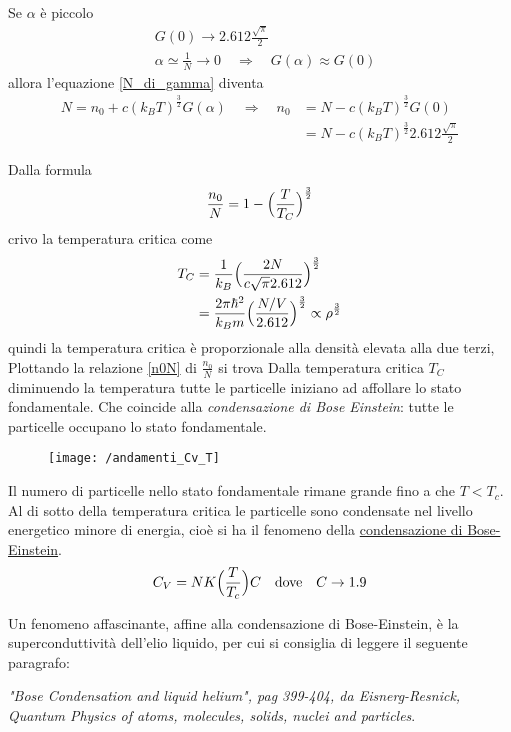 Se $\alpha$ è piccolo
\begin{equation}
\begin{split}
& G(0) \to 2.612 \frac{\sqrt{\pi}}{2} \\
& \alpha \simeq \frac{1}{N} \to 0 \quad\Rightarrow\quad G(\alpha) \approx G(0)
\end{split}
\end{equation}
allora l'equazione \ref{N_di_gamma} diventa
\begin{equation}
\begin{split}
N = n_0 + c (k_B T)^{ \frac{3}{2} } G(\alpha)
\quad\Rightarrow\quad 
n_0 & = N -  c (k_B T)^{ \frac{3}{2} } G(0) \\
& = N -  c (k_B T)^{ \frac{3}{2} } 2.612 \frac{\sqrt{\pi}}{2}
\end{split}
\end{equation}

Dalla formula 
\begin{equation}
\frac{n_0}{N} = 1 - \Bigl(  \frac{T}{T_C}  \Bigr)^{ \frac{3}{2} } 
\label{n0N}
\end{equation}
crivo la temperatura critica come
\begin{equation}
\begin{split}
T_C & = \frac{1}{k_B} \Bigl(  \frac{2N}{c \sqrt{\pi} 2.612}  \Bigr)^{ \frac{3}{2} } \\
&= \frac{2\pi \hbar^2}{k_B m} \Bigl(  \frac{N/V}{2.612}  \Bigr)^{ \frac{3}{2} } \propto \rho^{ \frac{3}{2} }
\end{split}
\end{equation}
quindi la temperatura critica è proporzionale alla densità elevata alla due terzi,
Plottando la relazione \ref{n0N} di $\frac{n_0}{N}$ si trova 
Dalla temperatura critica $T_C$ diminuendo la temperatura tutte le particelle iniziano ad affollare lo stato fondamentale.
Che coincide alla \emph{condensazione di Bose Einstein}: tutte le particelle occupano lo stato fondamentale.







	\newpage

\begin{figure}[h]
\centering
\texttt{[image: /andamenti\_Cv\_T]}
\end{figure}
Il numero di particelle nello stato fondamentale rimane grande fino a che $T < T_c$.
Al di sotto della temperatura critica le particelle sono condensate nel livello energetico minore di energia, cioè si ha il fenomeno della \underline{condensazione di Bose-Einstein}.
\begin{equation}
C_V = N K \Bigl(  \frac{ T}{T_c }  \Bigr) C \quad \mbox{dove} \quad C \to 1.9
\end{equation} 

Un fenomeno affascinante, affine alla condensazione di Bose-Einstein, è la superconduttività dell'elio liquido, per cui si consiglia di leggere il seguente paragrafo:

\textit{"Bose Condensation and liquid helium", pag 399-404, da Eisnerg-Resnick, Quantum Physics of atoms, molecules, solids, nuclei and particles}.






